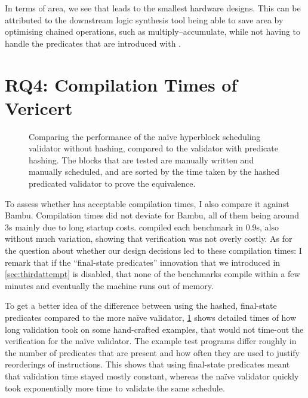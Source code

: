 In terms of area, we see that \VericertList{} leads to the smallest hardware
designs. This can be attributed to the downstream logic synthesis tool being
able to save area by optimising chained operations, such as
multiply--accumulate, while not having to handle the predicates that are
introduced with \VericertHyper{}.

\section{RQ4: Compilation Times of Vericert}

\begin{figure}
  \centering
  \resizebox{\linewidth}{!}{}
  \caption[Comparing the performance of predicate validators.]{Comparing the
    performance of the na\"ive hyperblock scheduling validator without hashing,
    compared to the validator with predicate hashing.  The blocks that are
    tested are manually written and manually scheduled, and are sorted by the
    time taken by the hashed predicated validator to prove the equivalence.}%
  \label{fig:eval:comparison-hashing}
\end{figure}

To assess whether \VericertHyper{} has acceptable compilation times, I also
compare it against Bambu.  Compilation times did not deviate for Bambu, all of
them being around 3s mainly due to long startup costs. \VericertHyper{} compiled
each benchmark in 0.9s, also without much variation, showing that verification
was not overly costly.  As for the question about whether our design decisions
led to these compilation times: I remark that if the \enquote{final-state
  predicates} innovation that we introduced in \cref{sec:thirdattempt} is
disabled, that none of the benchmarks compile within a few minutes and
eventually the machine runs out of memory.

To get a better idea of the difference between using the hashed, final-state
predicates compared to the more naïve validator,
\cref{fig:eval:comparison-hashing} shows detailed times of how long validation
took on some hand-crafted examples, that would not time-out the verification for
the naïve validator.  The example test programs differ roughly in the number of
predicates that are present and how often they are used to justify reorderings
of instructions.  This shows that using final-state predicates meant that
validation time stayed mostly constant, whereas the naïve validator quickly took
exponentially more time to validate the same schedule.

